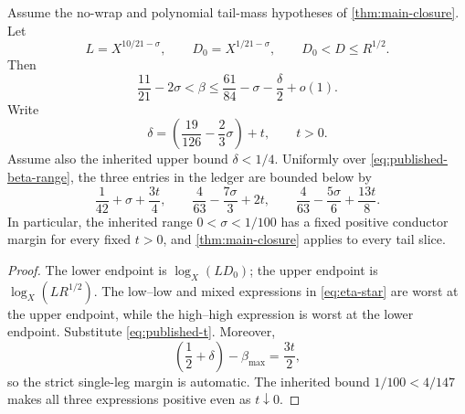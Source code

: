 \begin{corollary}
\label{cor:published-profile}
Assume the no-wrap and polynomial tail-mass hypotheses of
\cref{thm:main-closure}.  Let
\begin{equation}
 L=X^{10/21-\sigma},\qquad
 D_0=X^{1/21-\sigma},\qquad D_0<D\le R^{1/2}.
 \label{eq:published-data}
\end{equation}
Then
\begin{equation}
 \frac{11}{21}-2\sigma<\beta
 \le\frac{61}{84}-\sigma-\frac\delta2+o(1).
 \label{eq:published-beta-range}
\end{equation}
Write
\begin{equation}
 \delta=\left(\frac{19}{126}-\frac23\sigma\right)+t,
 \qquad t>0.
 \label{eq:published-t}
\end{equation}
Assume also the inherited upper bound \(\delta<1/4\).
Uniformly over \eqref{eq:published-beta-range}, the three entries in
the ledger are bounded below by
\begin{equation}
 \frac1{42}+\sigma+\frac{3t}{4},\qquad
 \frac4{63}-\frac{7\sigma}{3}+2t,\qquad
 \frac4{63}-\frac{5\sigma}{6}+\frac{13t}{8}.
 \label{eq:published-gains}
\end{equation}
In particular, the inherited range \(0<\sigma<1/100\) has a fixed
positive conductor margin for every fixed \(t>0\), and
\cref{thm:main-closure} applies to every tail slice.
\end{corollary}

\begin{proof}
The lower endpoint is \(\log_X(LD_0)\); the upper endpoint is
\(\log_X(LR^{1/2})\).  The low--low and mixed expressions in
\eqref{eq:eta-star} are worst at the upper endpoint, while the
high--high expression is worst at the lower endpoint.  Substitute
\eqref{eq:published-t}.  Moreover,
\[
 \left(\frac12+\delta\right)-\beta_{\max}=\frac{3t}{2},
\]
so the strict single-leg margin is automatic.  The inherited bound
\(1/100<4/147\) makes all
three expressions positive even as \(t\downarrow0\).
\end{proof}

